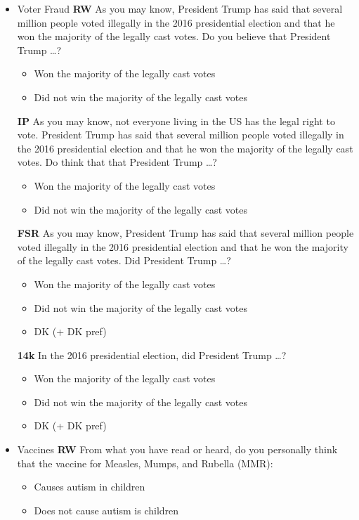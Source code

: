 \documentclass[12pt, letterpaper]{article}
\begin{document}
\begin{itemize}
\item Voter Fraud\newline
\textbf{RW}\newline
As you may know, President Trump has said that several million people voted
illegally in the 2016 presidential election and that he won the majority of the legally
cast votes. Do you believe that President Trump \ldots?
\begin{itemize}
	\item Won the majority of the legally cast votes
	\item Did not win the majority of the legally cast votes
\end{itemize}

\textbf{IP}\newline
As you may know, not everyone living in the US has the legal right to vote. President
Trump has said that several million people voted illegally in the 2016 presidential
election and that he won the majority of the legally cast votes. Do think that that
President Trump \ldots?
\begin{itemize}
	\item Won the majority of the legally cast votes
	\item Did not win the majority of the legally cast votes
\end{itemize}

\textbf{FSR}\newline
As you may know, President Trump has said that several million people voted
illegally in the 2016 presidential election and that he won the majority of the legally
cast votes. Did President Trump \ldots?
\begin{itemize}
	\item Won the majority of the legally cast votes
	\item Did not win the majority of the legally cast votes
	\item DK (+ DK pref)
\end{itemize}

\textbf{14k}\newline
In the 2016 presidential election, did President Trump \ldots?
\begin{itemize}
	\item Won the majority of the legally cast votes
	\item Did not win the majority of the legally cast votes
	\item DK (+ DK pref) 
\end{itemize}

\item Vaccines\newline
\textbf{RW}\newline
From what you have read or heard, do you personally think that the vaccine for
Measles, Mumps, and Rubella (MMR):
\begin{itemize}
	\item Causes autism in children
	\item Does not cause autism is children
\end{itemize}


\end{itemize}
\end{document}
